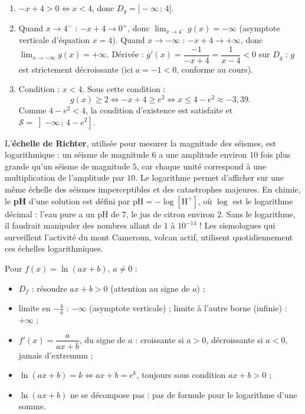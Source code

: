 \documentclass[11pt]{article}
\begin{document}
\begin{corrige}[Exercice : g(x) = ln(-x + 4)]
\begin{enumerate}
\item $-x+4>0 \iff x<4$, donc $D_g=]-\infty\,;\,4[$.
\item Quand $x\to 4^-$ : $-x+4\to 0^+$, donc $\displaystyle\lim_{x\to 4^-}g(x)=-\infty$ (asymptote verticale d'équation $x=4$). Quand $x\to-\infty$ : $-x+4\to+\infty$, donc $\displaystyle\lim_{x\to-\infty}g(x)=+\infty$. Dérivée : $g'(x)=\dfrac{-1}{-x+4}=\dfrac{1}{x-4}<0$ sur $D_g$ : $g$ est strictement décroissante (ici $a=-1<0$, conforme au cours).
\item Condition : $x<4$. Sous cette condition :
\[ g(x)\geq 2 \iff -x+4\geq e^{2} \iff x\leq 4-e^{2}\approx -3{,}39. \]
Comme $4-e^2<4$, la condition d'existence est satisfaite et $\mathcal{S}=\left]-\infty\,;\,4-e^{2}\right]$.
\end{enumerate}
\end{corrige}

\begin{savaistu}
L'\textbf{échelle de Richter}, utilisée pour mesurer la magnitude des séismes, est logarithmique : un séisme de magnitude $6$ a une amplitude environ $10$ fois plus grande qu'un séisme de magnitude $5$, car chaque unité correspond à une multiplication de l'amplitude par $10$. Le logarithme permet d'afficher sur une même échelle des séismes imperceptibles et des catastrophes majeures. En chimie, le \textbf{pH} d'une solution est défini par $\mathrm{pH}=-\log[\mathrm{H}^+]$, où $\log$ est le logarithme décimal : l'eau pure a un pH de $7$, le jus de citron environ $2$. Sans le logarithme, il faudrait manipuler des nombres allant de $1$ à $10^{-14}$ ! Les sismologues qui surveillent l'activité du mont Cameroun, volcan actif, utilisent quotidiennement ces échelles logarithmiques.
\end{savaistu}

\begin{aretenir}
Pour $f(x)=\ln(ax+b)$, $a\neq 0$ :
\begin{itemize}
\item $D_f$ : résoudre $ax+b>0$ (attention au signe de $a$) ;
\item limite en $-\frac{b}{a}$ : $-\infty$ (asymptote verticale) ; limite à l'autre borne (infinie) : $+\infty$ ;
\item $f'(x)=\dfrac{a}{ax+b}$, du signe de $a$ : croissante si $a>0$, décroissante si $a<0$, jamais d'extremum ;
\item $\ln(ax+b)=k \iff ax+b=e^k$, toujours sous condition $ax+b>0$ ;
\item $\ln(ax+b)$ ne se décompose pas : pas de formule pour le logarithme d'une somme.
\end{itemize}
\end{aretenir}
\end{document}
